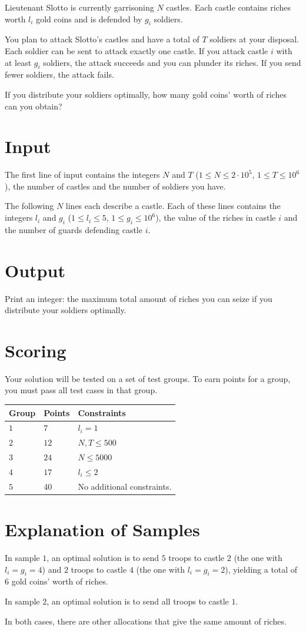 Lieutenant Slotto is currently garrisoning $N$ castles.
Each castle contains riches worth $l_i$ gold coins and is defended by $g_i$ soldiers.

You plan to attack Slotto's castles and have a total of $T$ soldiers at your disposal.
Each soldier can be sent to attack exactly one castle.
If you attack castle $i$ with at least $g_i$ soldiers, the attack succeeds and you can plunder its riches.
If you send fewer soldiers, the attack fails.

If you distribute your soldiers optimally, how many gold coins' worth of riches can you obtain?

\section*{Input}
The first line of input contains the integers $N$ and $T$ ($1 \leq N \leq 2 \cdot 10^5$, $1 \leq T \leq 10^6$),
the number of castles and the number of soldiers you have.

The following $N$ lines each describe a castle.
Each of these lines contains the integers $l_i$ and $g_i$ ($1 \leq l_i \leq 5$, $1 \leq g_i \leq 10^6$),
the value of the riches in castle $i$ and the number of guards defending castle $i$.

\section*{Output}
Print an integer: the maximum total amount of riches you can seize if you distribute your soldiers optimally.

\section*{Scoring}
Your solution will be tested on a set of test groups.
To earn points for a group, you must pass all test cases in that group.

\noindent
\begin{tabular}{| l | l | p{12cm} |}
  \hline
  \textbf{Group} & \textbf{Points} & \textbf{Constraints} \\ \hline
  $1$    & $7$   & $l_i=1$ \\ \hline
  $2$    & $12$  & $N, T \leq 500$ \\ \hline
  $3$    & $24$  & $N \leq 5000$ \\ \hline
  $4$    & $17$  & $l_i \leq 2$ \\ \hline
  $5$    & $40$  & No additional constraints. \\ \hline
\end{tabular}

\section*{Explanation of Samples}
In sample $1$, an optimal solution is to send $5$ troops to castle $2$ (the one with $l_i = g_i = 4$)
and $2$ troops to castle $4$ (the one with $l_i = g_i = 2$), yielding a total of $6$ gold coins' worth of riches.

In sample $2$, an optimal solution is to send all troops to castle $1$.

In both cases, there are other allocations that give the same amount of riches.
